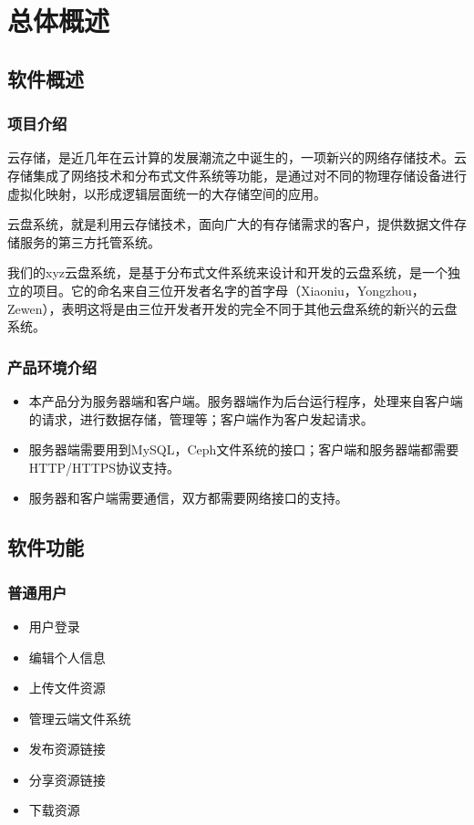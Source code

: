 \chapter{总体概述}

\section{软件概述}
\subsection{项目介绍}
云存储，是近几年在云计算的发展潮流之中诞生的，一项新兴的网络存储技术。云存储集成了网络技术和分布式文件系统等功能，是通过对不同的物理存储设备进行虚拟化映射，以形成逻辑层面统一的大存储空间的应用。

云盘系统，就是利用云存储技术，面向广大的有存储需求的客户，提供数据文件存储服务的第三方托管系统。

我们的xyz云盘系统，是基于分布式文件系统来设计和开发的云盘系统，是一个独立的项目。它的命名来自三位开发者名字的首字母（Xiaoniu，Yongzhou，Zewen），表明这将是由三位开发者开发的完全不同于其他云盘系统的新兴的云盘系统。

\subsection{产品环境介绍}

\begin{itemize}
	\item 本产品分为服务器端和客户端。服务器端作为后台运行程序，处理来自客户端的请求，进行数据存储，管理等；客户端作为客户发起请求。
	\item 服务器端需要用到MySQL，Ceph文件系统的接口；客户端和服务器端都需要HTTP/HTTPS协议支持。
	\item 服务器和客户端需要通信，双方都需要网络接口的支持。
\end{itemize}
\section{软件功能}

\subsection{普通用户}
\begin{itemize}
	\item 用户登录
	\item 编辑个人信息
	\item 上传文件资源
	\item 管理云端文件系统
	\item 发布资源链接
	\item 分享资源链接
	\item 下载资源
\end{itemize}

